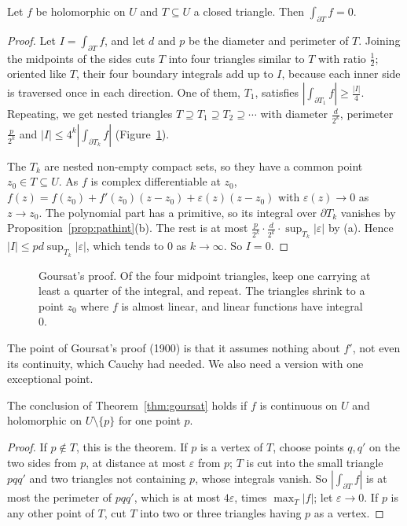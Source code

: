\begin{theorem}[Goursat]\label{thm:goursat}
Let $f$ be holomorphic on $U$ and $T\subseteq U$ a closed triangle. Then $\int_{\partial T}f=0$.
\end{theorem}
\begin{proof}
Let $I=\int_{\partial T}f$, and let $d$ and $p$ be the diameter and perimeter of $T$. Joining the midpoints of the sides cuts $T$ into four
triangles similar to $T$ with ratio $\frac12$; oriented like $T$, their four boundary integrals add up to $I$, because each inner side
is traversed once in each direction. One of them, $T_1$, satisfies $|\int_{\partial T_1}f|\ge\frac{|I|}4$. Repeating, we get nested triangles
$T\supseteq T_1\supseteq T_2\supseteq\cdots$ with diameter $\frac d{2^k}$, perimeter $\frac p{2^k}$ and $|I|\le4^k|\int_{\partial T_k}f|$ (Figure~\ref{fig:goursat}).

The $T_k$ are nested non-empty compact sets, so they have a common point $z_0\in T\subseteq U$. As $f$ is complex differentiable at $z_0$,
$f(z)=f(z_0)+f'(z_0)(z-z_0)+\varepsilon(z)(z-z_0)$ with $\varepsilon(z)\to0$ as $z\to z_0$. The polynomial part has a primitive, so its integral over
$\partial T_k$ vanishes by Proposition~\ref{prop:pathint}(b). The rest is at most $\frac p{2^k}\cdot\frac d{2^k}\cdot\sup_{T_k}|\varepsilon|$ by (a). Hence
$|I|\le pd\sup_{T_k}|\varepsilon|$, which tends to $0$ as $k\to\infty$. So $I=0$.
\end{proof}

\begin{figure}[ht]
\centering
{}
\caption{Goursat's proof. Of the four midpoint triangles, keep one carrying at least a quarter of the integral, and repeat. The
triangles shrink to a point $z_0$ where $f$ is almost linear, and linear functions have integral $0$.}
\label{fig:goursat}
\end{figure}

The point of Goursat's proof (1900) is that it assumes nothing about $f'$, not even its continuity, which Cauchy had needed.
We also need a version with one exceptional point.

\begin{corollary}\label{cor:goursatpoint}
The conclusion of Theorem~\ref{thm:goursat} holds if $f$ is continuous on $U$ and holomorphic on $U\setminus\{p\}$ for one point $p$.
\end{corollary}
\begin{proof}
If $p\notin T$, this is the theorem. If $p$ is a vertex of $T$, choose points $q,q'$ on the two sides from $p$, at distance at most
$\varepsilon$ from $p$; $T$ is cut into the small triangle $pqq'$ and two triangles not containing $p$, whose integrals vanish. So $|\int_{\partial T}f|$ is
at most the perimeter of $pqq'$, which is at most $4\varepsilon$, times $\max_T|f|$; let $\varepsilon\to0$. If $p$ is any other point of $T$, cut $T$ into
two or three triangles having $p$ as a vertex.
\end{proof}

